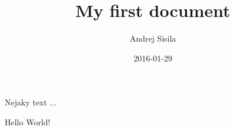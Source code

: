 \documentclass{article}
\title{My first document}
\date{2016-01-29}
\author{Andrej Sisila}
\begin{document}
	\maketitle
	\newpage
	Nejaky text ...
	\newpage
	
	Hello World!
\end{document}
